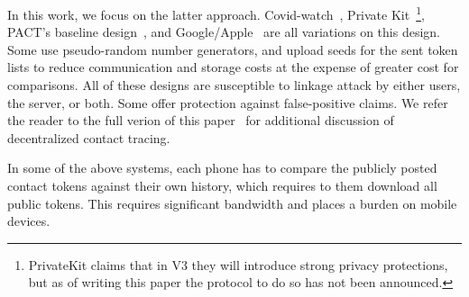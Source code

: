 In this work, we focus on the latter approach. Covid-watch~\cite{Covid-watch}, Private Kit~\cite{PrivateKit}\footnote{PrivateKit claims that in V3 they will introduce strong privacy protections, but as of writing this paper the protocol to do so has not been announced.}, PACT's baseline design~\cite{chan2020pact}, and Google/Apple~\cite{google-apple} are all variations on this design. Some use pseudo-random number generators, and upload seeds for the sent token lists to reduce communication and storage costs at the expense of greater cost for comparisons. All of these designs are susceptible to linkage attack by either users, the server, or both. Some offer protection against false-positive claims. We refer the reader to the full verion of this paper~\cite{epione} for additional discussion of decentralized contact tracing.

In some of the above systems, each phone has to compare the publicly posted contact tokens against their own history, which requires to them download all public tokens. This requires significant bandwidth and places a burden on mobile devices.

